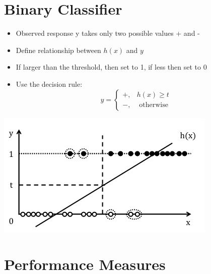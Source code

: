 \documentclass{article}[18pt]
\begin{document}
\section{Binary Classifier}
\begin{itemize}
	\item Observed response y takes only two possible values + and -
	\item Define relationship between $h(x)$ and $y$
	\item If larger than the threshold, then set to 1, if less then set to 0
	\item Use the decision rule:
	\[
	\hat{y}=\left\{\begin{array}{ll}
	{+,} & {h(x) \geq t} \\
	{-,} & {\text { otherwise }}
	\end{array}\right.
	\]
\end{itemize}
\begin{center}
	\includegraphics[scale=0.7]{"Binary Classifier"}
\end{center}
\section{Performance Measures}
\end{document}
